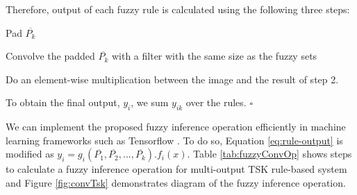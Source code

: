 \documentclass{article}
\newcommand*{\QEDB}{\hfill\ensuremath{\square}}
\begin{document}
Therefore, output of each fuzzy rule is calculated using the following three steps: \begin{inparaenum} \item Pad $\overline{P_k}$ \item Convolve the padded $\overline{P_k}$ with a filter with the same size as the fuzzy sets \item Do an element-wise multiplication between the image and the result of step 2. \end{inparaenum}To obtain the final output, $y_i$, we sum $y_{ik}$ over the rules. \QEDB

We can implement the proposed fuzzy inference operation efficiently in machine learning frameworks such as Tensorflow \citep{abadi2016tensorflow}.  To do so, Equation \ref{eq:rule-output} is modified as $y_i=g_i(\overline{P_1},\overline{P_2},...,\overline{P_k}).f_i (x)$. Table \ref{tab:fuzzyConvOp} shows steps to calculate a fuzzy inference operation for multi-output TSK rule-based system and Figure \ref{fig:convTsk} demonstrates diagram of the fuzzy inference operation.
\end{document}
